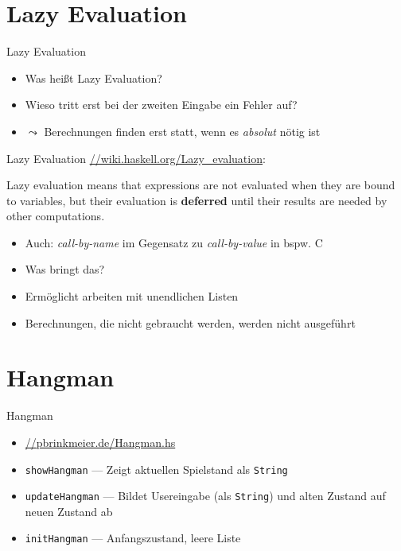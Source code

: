 \documentclass{beamer}
\newcommand{\code}[1]{
	\begin{mdframed}
		
	\end{mdframed}
}
\begin{document}
\section{Lazy Evaluation}

\begin{frame}{Lazy Evaluation}
	\code{code/ghci-lazy.output}

	\begin{itemize}
		\item Was heißt Lazy Evaluation?
		\item Wieso tritt erst bei der zweiten Eingabe ein Fehler auf?
		\pause
		\item $\leadsto$ Berechnungen finden erst statt, wenn es \emph{absolut} nötig ist
	\end{itemize}
\end{frame}

\begin{frame}{Lazy Evaluation}
	\url{//wiki.haskell.org/Lazy\_evaluation}:

	\begin{displayquote}
		Lazy evaluation means that expressions are not evaluated when they are bound to variables, but their evaluation is \textbf{deferred} until their results are needed by other computations.
	\end{displayquote}

	\begin{itemize}
		\item Auch: \emph{call-by-name} im Gegensatz zu \emph{call-by-value} in bspw. C
		\item Was bringt das?
		\pause
		\item Ermöglicht arbeiten mit unendlichen Listen
		\item Berechnungen, die nicht gebraucht werden, werden nicht ausgeführt
	\end{itemize}
\end{frame}

\section{Hangman}

\begin{frame}{Hangman}
	\begin{itemize}
		\item \url{//pbrinkmeier.de/Hangman.hs}
		\item \texttt{showHangman} --- Zeigt aktuellen Spielstand als \texttt{String}
		\item \texttt{updateHangman} --- Bildet Usereingabe (als \texttt{String}) und alten Zustand auf neuen Zustand ab
		\item \texttt{initHangman} --- Anfangszustand, leere Liste
	\end{itemize}
\end{frame}
\end{document}
